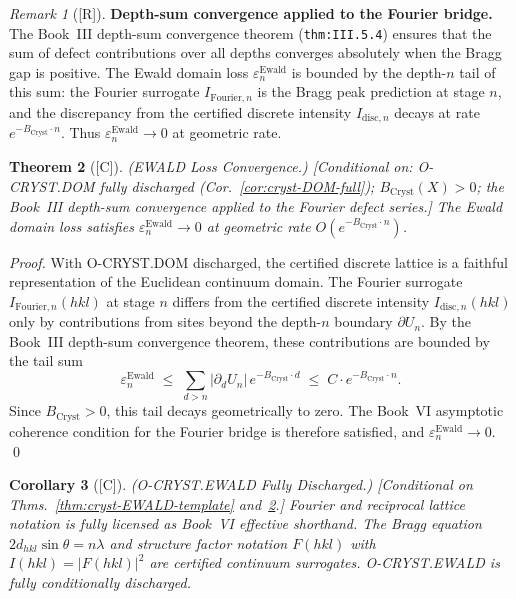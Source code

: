 \documentclass[12pt,oneside]{amsbook}
\theoremstyle{plain}
\newtheorem{theorem}{Theorem}[section]
\newtheorem{corollary}[theorem]{Corollary}
\theoremstyle{definition}
\theoremstyle{remark}
\newtheorem{remark}[theorem]{Remark}
\newcommand{\status}[1]{\textup{[#1]}}
\begin{document}
\begin{remark}[\status{R}]\label{rem:cryst-ewald-eps-route}
\textbf{Depth-sum convergence applied to the Fourier bridge.}
The Book~III depth-sum convergence theorem
(\texttt{thm:III.5.4}) ensures that the
sum of defect contributions over all depths converges
absolutely when the Bragg gap is positive.  The Ewald domain
loss $\varepsilon^{\mathrm{Ewald}}_n$ is bounded by the
depth-$n$ tail of this sum: the Fourier surrogate $I_{\mathrm{Fourier},n}$
is the Bragg peak prediction at stage $n$, and the discrepancy
from the certified discrete intensity $I_{\mathrm{disc},n}$
decays at rate $e^{-B_{\mathrm{Cryst}} \cdot n}$.  Thus
$\varepsilon^{\mathrm{Ewald}}_n \to 0$ at geometric rate.
\end{remark}

\begin{theorem}[\status{C}]\label{thm:cryst-ewald-eps}
\textup{(EWALD Loss Convergence.)}
\textup{[Conditional on: O-CRYST.DOM fully discharged
(Cor.~\ref{cor:cryst-DOM-full}); $B_{\mathrm{Cryst}}(X) > 0$;
the Book~III depth-sum convergence applied to the Fourier
defect series.]}
The Ewald domain loss satisfies
$\varepsilon^{\mathrm{Ewald}}_n \to 0$
at geometric rate $O(e^{-B_{\mathrm{Cryst}} \cdot n})$.
\end{theorem}

\begin{proof}
With O-CRYST.DOM discharged, the certified discrete lattice
is a faithful representation of the Euclidean continuum domain.
The Fourier surrogate $I_{\mathrm{Fourier},n}(hkl)$ at stage $n$
differs from the certified discrete intensity $I_{\mathrm{disc},n}(hkl)$
only by contributions from sites beyond the depth-$n$ boundary
$\partial U_n$.  By the Book~III depth-sum convergence theorem,
these contributions are bounded by the tail sum
\[
  \varepsilon^{\mathrm{Ewald}}_n
  \;\le\;
  \sum_{d > n} |\partial_d U_n|\, e^{-B_{\mathrm{Cryst}} \cdot d}
  \;\le\;
  C \cdot e^{-B_{\mathrm{Cryst}} \cdot n}.
\]
Since $B_{\mathrm{Cryst}} > 0$, this tail decays geometrically to
zero.  The Book~VI asymptotic coherence condition for the Fourier
bridge is therefore satisfied, and
$\varepsilon^{\mathrm{Ewald}}_n \to 0$.
\qed
\end{proof}

\begin{corollary}[\status{C}]\label{cor:cryst-EWALD-full}
\textup{(O-CRYST.EWALD Fully Discharged.)}
\textup{[Conditional on Thms.~\ref{thm:cryst-EWALD-template}
and~\ref{thm:cryst-ewald-eps}.]}
Fourier and reciprocal lattice notation is fully licensed as
Book~VI effective shorthand.  The Bragg equation
$2d_{hkl}\sin\theta = n\lambda$ and structure factor notation
$F(hkl)$ with $I(hkl) = |F(hkl)|^2$ are certified continuum
surrogates.  O-CRYST.EWALD is fully conditionally discharged.
\end{corollary}
\end{document}
